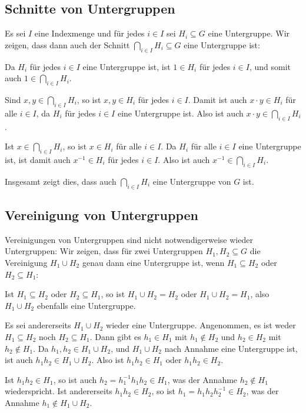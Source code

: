 \subsection{Schnitte von Untergruppen}
Es sei $I$ eine Indexmenge und für jedes $i \in I$ sei $H_i \subseteq G$ eine Untergruppe. Wir zeigen, dass dann auch der Schnitt $\bigcap_{i \in I} H_i \subseteq G$ eine Untergruppe ist:

Da $H_i$ für jedes $i \in I$ eine Untergruppe ist, ist $1 \in H_i$ für jedes $i \in I$, und somit auch $1 \in \bigcap_{i \in I} H_i$.

Sind $x,y \in \bigcap_{i \in I} H_i$, so ist $x,y \in H_i$ für jedes $i \in I$. Damit ist auch $x \cdot y \in H_i$ für alle $i \in I$, da $H_i$ für jedes $i \in I$ eine Untergruppe ist. Also ist auch $x \cdot y \in \bigcap_{i \in I} H_i$.

Ist $x \in \bigcap_{i \in I} H_i$, so ist $x \in H_i$ für alle $i \in I$. Da $H_i$ für alle $i \in I$ eine Untergruppe ist, ist damit auch $x^{-1} \in H_i$ für jedes $i \in I$. Also ist auch $x^{-1} \in \bigcap_{i \in I} H_i$.

Insgesamt zeigt dies, dass auch $\bigcap_{i \in I} H_i$ eine Untergruppe von $G$ ist.


\subsection{Vereinigung von Untergruppen}\label{ssec: union of subgroups}
Vereinigungen von Untergruppen sind nicht notwendigerweise wieder Untergruppen: Wir zeigen, dass für zwei Untergruppen $H_1, H_2 \subseteq G$ die Vereinigung $H_1 \cup H_2$ genau dann eine Untergruppe ist, wenn $H_1 \subseteq H_2$ oder $H_2 \subseteq H_1$:

Ist $H_1 \subseteq H_2$ oder $H_2 \subseteq H_1$, so ist $H_1 \cup H_2 = H_2$ oder $H_1 \cup H_2 = H_1$, also $H_1 \cup H_2$ ebenfalls eine Untergruppe.

Es sei andererseits $H_1 \cup H_2$ wieder eine Untergruppe. Angenommen, es ist weder $H_1 \subseteq H_2$ noch $H_2 \subseteq H_1$. Dann gibt es $h_1 \in H_1$ mit $h_1 \notin H_2$ und $h_2 \in H_2$ mit $h_2 \notin H_1$. Da $h_1, h_2 \in H_1 \cup H_2$, und $H_1 \cup H_2$ nach Annahme eine Untergruppe ist, ist auch $h_1 h_2 \in H_1 \cup H_2$. Also ist $h_1 h_2 \in H_1$ oder $h_1 h_2 \in H_2$.

Ist $h_1 h_2 \in H_1$, so ist auch $h_2 = h_1^{-1} h_1 h_2 \in H_1$, was der Annahme $h_2 \notin H_1$ wiederspricht. Ist andererseits $h_1 h_2 \in H_2$, so ist $h_1 = h_1 h_2 h_2^{-1} \in H_2$, was der Annahme $h_1 \notin H_1 \cup H_2$.

